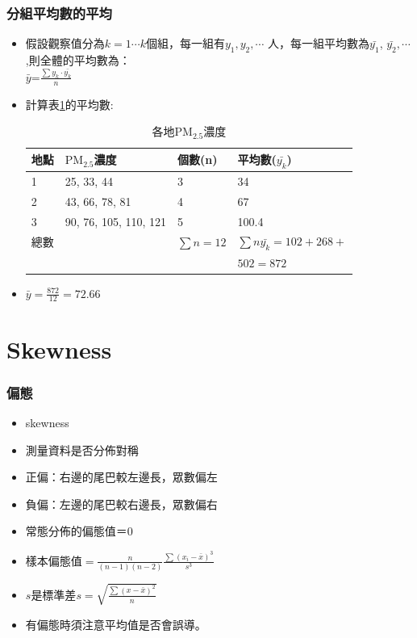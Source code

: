 \documentclass{beamer}
\begin{document}
\begin{frame}\frametitle{分組平均數的平均}
\begin{itemize}
\item 假設觀察值分為$k=1\cdots k$個組，每一組有$y_{1}, y_{2},\cdots $ 人，每一組平均數為$\bar{y_{1}}$, $\bar{y_{2}},\cdots $,則全體的平均數為：\\
\Large
 $\bar{y}$=$\frac{\sum y_{k}\cdot \bar{y_{k}}}{n}$
 \normalsize
 \item 計算表\ref{tab:pm25}的平均數:
\begin{table}
\caption{各地$\textrm{PM}_{2.5}$濃度}
\label{tab:pm25}
\begin{tabular}{| l |  l | l | l |}
\hline
地點 &  $\textrm{PM}_{2.5}$濃度 & 個數(n)& 平均數($\bar{y_{k}}$)\\
\hline
1 & 25, 33, 44 & 3 & 34\\
2 & 43, 66, 78, 81 & 4 & 67\\
3 & 90, 76, 105, 110, 121 & 5 & 100.4\\
\hline
總數 &  & $\sum n= 12$ & $\sum n\bar{y_{k}}=102+268+$\\
  & & & $502=872$\\
\hline
\end{tabular}
\end{table}
\item $\bar{y}=\frac{872}{12}=72.66$
 \end{itemize}
\end{frame}
\section{Skewness}
\begin{frame}\frametitle{偏態}
\begin{itemize}
\item skewness
\item 測量資料是否分佈對稱
\item 正偏：右邊的尾巴較左邊長，眾數偏左
\item 負偏：左邊的尾巴較右邊長，眾數偏右
\item 常態分佈的偏態值＝0
\item 樣本偏態值$=\frac{n}{(n-1)(n-2)} \frac{\sum (x_{i}-\bar{x})^3}{s^3}$
\item $s$是標準差$s=\sqrt{\frac{\sum (x-\bar{x})^2}{n}}$
\item 有偏態時須注意平均值是否會誤導。
\end{itemize}
\end{frame}
\end{document}
